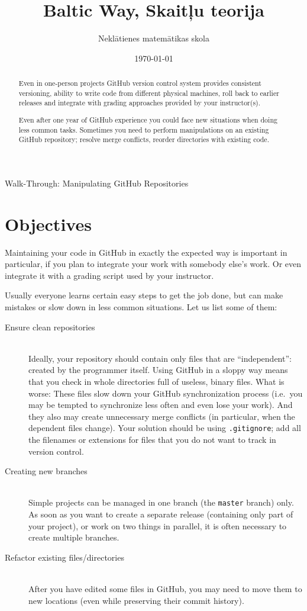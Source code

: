 \documentclass[11pt,a4paper]{article}
\title{\Huge\bfseries \color{FP-Green}Baltic Way, Skaitļu teorija}
\author{Neklātienes matemātikas skola}
\date{\today}
\begin{document}

\begin{center}
{\LARGE Walk-Through: Manipulating GitHub Repositories}
\end{center}


\begin{abstract}
Even in one-person projects GitHub version control system provides consistent
versioning, ability to write code from different physical machines, 
roll back to earlier releases and integrate with grading approaches 
provided by your instructor(s). 

Even after one year of GitHub experience you could face new situations
when doing less common tasks. 
Sometimes you need to perform manipulations on an existing GitHub repository; 
resolve merge conflicts, reorder directories with existing code. 
\end{abstract}


\section{Objectives}

Maintaining your code in GitHub in exactly the expected way is
important \textendash{} in particular, if you plan to integrate
your work with somebody else's work. Or even integrate it with 
a grading script used by your instructor. 

Usually everyone learns certain easy steps to get the job done, 
but can make mistakes or slow down in less common situations. 
Let us list some of them:

\begin{description}
\item[Ensure clean repositories] \hfill \\
Ideally, your repository should contain only files that are ``independent'': created
by the programmer itself. Using GitHub in a sloppy way means that you check
in whole directories full of useless, binary files. What is worse: These files
slow down your GitHub synchronization process (i.e.\ you may be tempted to synchronize
less often and even lose your work). And they also may create unnecessary merge conflicts 
(in particular, when the dependent files change).
Your solution should be using {\tt .gitignore}; add all the filenames or extensions for 
files that you do not want to track in version control.
\item[Creating new branches] \hfill \\
Simple projects can be managed in one branch (the {\tt master} branch) only. 
As soon as you want to create a separate release (containing only part of your project), 
or work on two things in parallel, it is often necessary to create multiple branches.
\item[Refactor existing files/directories] \hfill \\
After you have edited some files in GitHub, you may need to move them to new locations
(even while preserving their commit history).
\end{description}
\end{document}
